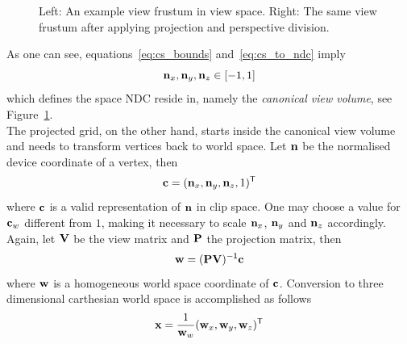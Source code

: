 \begin{figure}
\centering
{}
\caption{Left: An example view frustum in view space. Right: The same view frustum
after applying projection and perspective division.}
\label{fig:proj_frustum_ndc}
\end{figure}
%
%
As one can see, equations~\ref{eq:cs_bounds}
and~\ref{eq:cs_to_ndc} imply
\begin{equation}
\label{eq:ndc_bounds}
 \mvecx{n}, \mvecy{n}, \mvecz{n} \in \interval{-1}{1}
\end{equation}
which defines the space NDC reside in, namely the \textit{canonical view volume},
see Figure~\ref{fig:proj_frustum_ndc}.\\


The projected grid, on the other hand, starts inside the canonical view volume
and needs to transform vertices back to world space. Let $\mathbf{n}$ be the
normalised device coordinate of a vertex, then
\begin{equation}
\label{eq:ndc_to_cs}
 \mathbf{c} = (\mathbf{n}_x, \mathbf{n}_y, \mathbf{n}_z, 1)^{\mathsf{T}}
\end{equation}
where $\mathbf{c}$ is a valid representation of $\mathbf{n}$ in clip space. One may choose
a value for $\mathbf{c}_w$ different from $1$, making it necessary to scale $\mathbf{n}_x$,
$\mathbf{n}_y$ and $\mathbf{n}_z$ accordingly. Again, let $\mathbf{V}$ be the view matrix and
$\mathbf{P}$ the projection matrix, then
\begin{equation}
\label{eq:cs_to_wsh}
 \mathbf{w} = (\mathbf{P} \mathbf{V})^{\mathsf{-1}} \mathbf{c}
\end{equation}
where $\mathbf{w}$ is a homogeneous world space coordinate of $\mathbf{c}$. Conversion
to three dimensional carthesian world space is accomplished as follows
\begin{equation}
\label{eq:wsh_to_ws}
 \mathbf{x} = \frac{1}{\mathbf{w}_w}(\mathbf{w}_x, \mathbf{w}_y, \mathbf{w}_z)^{\mathsf{T}}
\end{equation}

